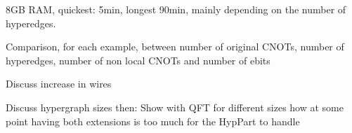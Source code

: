 8GB RAM, quickest: 5min, longest 90min, mainly depending on the number of hyperedges.


Comparison, for each example, between number of original CNOTs, number of hyperedges, number of non local CNOTs and number of ebits

Discuss increase in wires

Discuss hypergraph sizes then: Show with QFT for different sizes how at some point having both extensions is too much for the HypPart to handle

